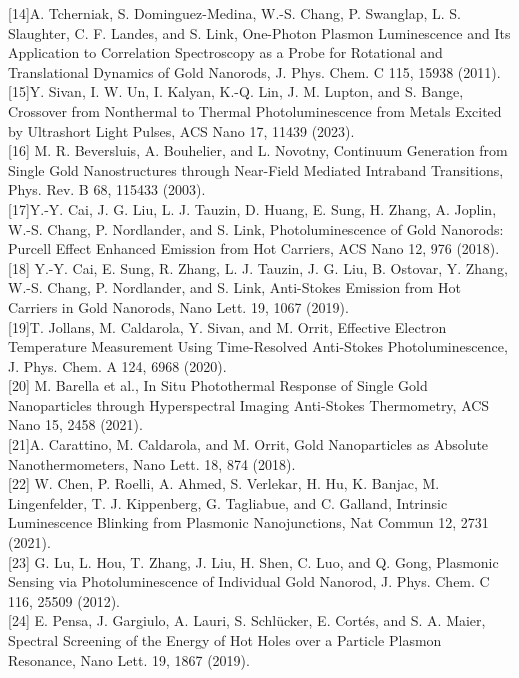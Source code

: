 \documentclass[10pt]{article}
\begin{document}
[14]A. Tcherniak, S. Dominguez-Medina, W.-S. Chang, P. Swanglap, L. S. Slaughter, C. F. Landes, and S. Link, One-Photon Plasmon Luminescence and Its Application to Correlation Spectroscopy as a Probe for Rotational and Translational Dynamics of Gold Nanorods, J. Phys. Chem. C 115, 15938 (2011).\\[0pt]
[15]Y. Sivan, I. W. Un, I. Kalyan, K.-Q. Lin, J. M. Lupton, and S. Bange, Crossover from Nonthermal to Thermal Photoluminescence from Metals Excited by Ultrashort Light Pulses, ACS Nano 17, 11439 (2023).\\[0pt]
[16] M. R. Beversluis, A. Bouhelier, and L. Novotny, Continuum Generation from Single Gold Nanostructures through Near-Field Mediated Intraband Transitions, Phys. Rev. B 68, 115433 (2003).\\[0pt]
[17]Y.-Y. Cai, J. G. Liu, L. J. Tauzin, D. Huang, E. Sung, H. Zhang, A. Joplin, W.-S. Chang, P. Nordlander, and S. Link, Photoluminescence of Gold Nanorods: Purcell Effect Enhanced Emission from Hot Carriers, ACS Nano 12, 976 (2018).\\[0pt]
[18] Y.-Y. Cai, E. Sung, R. Zhang, L. J. Tauzin, J. G. Liu, B. Ostovar, Y. Zhang, W.-S. Chang, P. Nordlander, and S. Link, Anti-Stokes Emission from Hot Carriers in Gold Nanorods, Nano Lett. 19, 1067 (2019).\\[0pt]
[19]T. Jollans, M. Caldarola, Y. Sivan, and M. Orrit, Effective Electron Temperature Measurement Using Time-Resolved Anti-Stokes Photoluminescence, J. Phys. Chem. A 124, 6968 (2020).\\[0pt]
[20] M. Barella et al., In Situ Photothermal Response of Single Gold Nanoparticles through Hyperspectral Imaging Anti-Stokes Thermometry, ACS Nano 15, 2458 (2021).\\[0pt]
[21]A. Carattino, M. Caldarola, and M. Orrit, Gold Nanoparticles as Absolute Nanothermometers, Nano Lett. 18, 874 (2018).\\[0pt]
[22] W. Chen, P. Roelli, A. Ahmed, S. Verlekar, H. Hu, K. Banjac, M. Lingenfelder, T. J. Kippenberg, G. Tagliabue, and C. Galland, Intrinsic Luminescence Blinking from Plasmonic Nanojunctions, Nat Commun 12, 2731 (2021).\\[0pt]
[23] G. Lu, L. Hou, T. Zhang, J. Liu, H. Shen, C. Luo, and Q. Gong, Plasmonic Sensing via Photoluminescence of Individual Gold Nanorod, J. Phys. Chem. C 116, 25509 (2012).\\[0pt]
[24] E. Pensa, J. Gargiulo, A. Lauri, S. Schlücker, E. Cortés, and S. A. Maier, Spectral Screening of the Energy of Hot Holes over a Particle Plasmon Resonance, Nano Lett. 19, 1867 (2019).\\[0pt]
\end{document}
